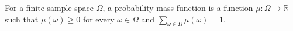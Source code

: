 \begin{definition}
For a finite sample space $\Omega$, a probability mass function is a function
$\mu:\Omega\to\mathbb R$ such that $\mu(\omega)\ge 0$ for every
$\omega\in\Omega$ and $\sum_{\omega\in\Omega}\mu(\omega)=1$.
\end{definition}
